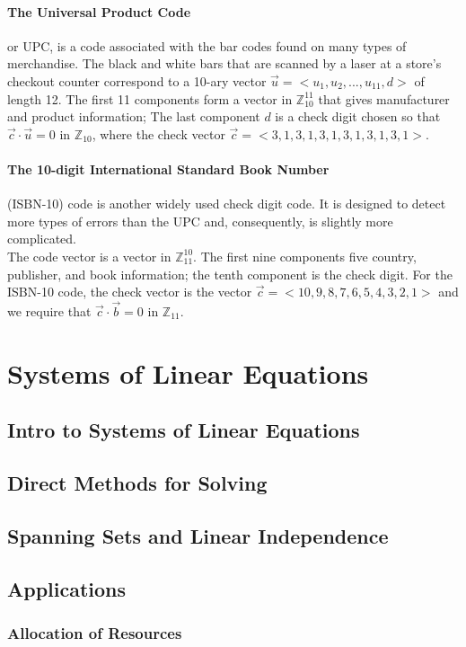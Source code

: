 \documentclass{article}
\newcommand{\p}[1]{\paragraph{#1}} %
\begin{document}
		\p{The Universal Product Code} or UPC, is a code associated with the bar codes found on 
		many types of merchandise. The black and white bars that are scanned by a laser at a 
		store's checkout counter correspond to a 10-ary vector $\vec{u} = <u_1,u_2,...,u_{11},d>$ of 
		length 12. The first 11 components form a vector in $\mathbb{Z}_{10}^{11}$ that gives 
		manufacturer and product information; The last component $d$ is a check digit chosen so 
		that $\vec{c} \cdot \vec{u} = 0 \text{ in } \mathbb{Z}_10$, where the check vector $\vec{c} = 
		<3,1,3,1,3,1,3,1,3,1,3,1>$. 
		
		\p{The 10-digit International Standard Book Number} (ISBN-10) code is another widely used 
		check digit code. It is designed to detect more types of errors than the UPC and, 
		consequently, is slightly more complicated. \\ The code vector is a vector in $\mathbb{Z}
		_{11}^{10}$. The first nine components five country, publisher, and book information; the 
		tenth component is the check digit. For the ISBN-10 code, the check vector is the vector $
		\vec{c} = <10,9,8,7,6,5,4,3,2,1>$ and we require that $\vec{c} \cdot \vec{b} = 0 \text{ in } 
		\mathbb{Z}_{11}$.

\clearpage
\section{Systems of Linear Equations} %

	\subsection{Intro to Systems of Linear Equations}
	
	\subsection{Direct Methods for Solving}
	
	\subsection{Spanning Sets and Linear Independence}
	
	\subsection{Applications}
	
		\subsubsection{Allocation of Resources}
\end{document}
